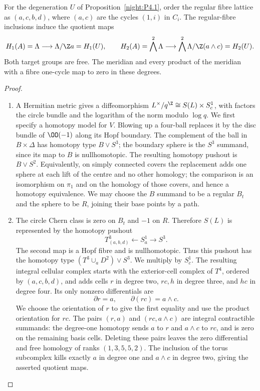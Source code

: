 \begin{proposition}\hypertarget{tag-02X2}{}\label{night:P4.3}\label{stmt:P4.3}

For the degeneration $U$ of Proposition~\ref{night:P4.1}, order the
regular fibre lattice as $(a,c,b,d)$, where $(a,c)$ are the cycles
$(1,i)$ in $C_i$. The regular-fibre inclusions induce the quotient maps
\[
 H_1(A)=\Lambda\longrightarrow\Lambda/\Z a=H_1(U),\qquad
 H_2(A)=\bigwedge^2\Lambda\longrightarrow
 \bigwedge^2\Lambda/\Z(a\wedge c)=H_2(U).
\]
Both target groups are free. The meridian and every product of the
meridian with a fibre one-cycle map to zero in these degrees.
\end{proposition}
\begin{proof}

\begin{enumerate}[label={$\langle1\rangle$\arabic*.},leftmargin=*]
\item A Hermitian metric gives a diffeomorphism
$L^\times/q^\Z\cong S(L)\times S^1_c$, with factors the circle bundle and
the logarithm of the norm modulo $\log q$. We first specify a homotopy
model for $V$. Blowing up a four-ball replaces it by the disc bundle of
$\OO(-1)$ along its Hopf boundary. The complement of the ball in
$B\times\Delta$ has homotopy type $B\vee S^3$; the boundary sphere is
the $S^3$ summand, since its map to $B$ is nullhomotopic. The resulting
homotopy pushout is $B\vee S^2$. Equivalently, on simply connected
covers the replacement adds one sphere at each lift of the centre and
no other homology; the comparison is an isomorphism on $\pi_1$ and on
the homology of those covers, and hence a homotopy equivalence. We may
choose the $B$ summand to be a regular $B_t$ and the sphere to be $R$,
joining their base points by a path.

\item The circle Chern class is zero on $B_t$ and $-1$ on $R$. Therefore
$S(L)$ is represented by the homotopy pushout
\[
 T^3_{(a,b,d)}\longleftarrow S^1_a\longrightarrow S^3.
\]
The second map is a Hopf fibre and is nullhomotopic. Thus this pushout
has the homotopy type $(T^3\cup_aD^2)\vee S^3$. We multiply by $S^1_c$.
The resulting integral cellular complex starts with the exterior-cell
complex of $T^4$, ordered by $(a,c,b,d)$, and adds cells $r$ in degree
two, $rc,h$ in degree three, and $hc$ in degree four. Its only nonzero
differentials are
\[
 \partial r=a,\qquad \partial(rc)=a\wedge c.
\]
We choose the orientation of $r$ to give the first equality and use the
product orientation for $rc$. The pairs $(r,a)$ and $(rc,a\wedge c)$
are integral contractible summands: the degree-one homotopy sends
$a$ to $r$ and $a\wedge c$ to $rc$, and is zero on the remaining
basis cells. Deleting these pairs leaves the zero differential and
free homology of ranks $(1,3,5,5,2)$. The inclusion of the torus
subcomplex kills exactly $a$ in degree one and $a\wedge c$ in
degree two, giving the asserted quotient maps.


\end{enumerate}
\end{proof}
